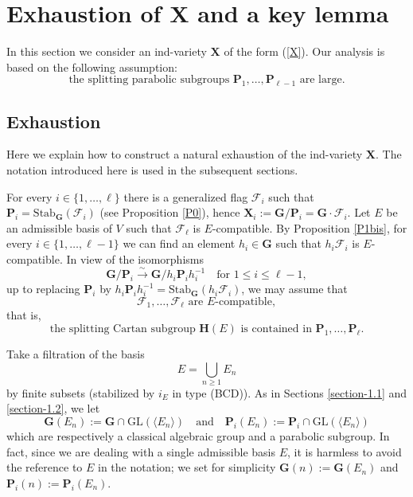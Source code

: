 \documentclass[12pt]{amsart}
\newcommand{\GL}{\mathrm{GL}}
\newcommand{\G}{\mathbf{G}}
\renewcommand{\H}{\mathbf{H}}
\renewcommand{\P}{\mathbf{P}}
\newcommand{\X}{\mathbf{X}}
\newcommand{\Ff}{\mathcal{F}}
\newcommand{\Stab}{\mathrm{Stab}}
\numberwithin{equation}{section}
\theoremstyle{definition}
\begin{document}
\section{Exhaustion of $\X$ and a key lemma}



\label{section-4}

In this section we consider an ind-variety $\X$ of the form (\ref{X}). Our analysis is based on the following assumption: 
\begin{equation}
\label{all-but-one}
\mbox{the splitting parabolic subgroups $\P_1,\ldots,\P_{\ell-1}$ are large.}
\end{equation}

\subsection{Exhaustion}

\label{exhaustion}

Here we explain how to construct a natural exhaustion of the ind-variety $\X$. The notation introduced here is used in the subsequent sections.

For every $i\in\{1,\ldots,\ell\}$ there is a generalized flag $\Ff_i$ such that $\P_i=\Stab_\G(\Ff_i)$ (see Proposition \ref{P0}), hence $\X_i:=\G/\P_i=\G\cdot\Ff_i$. Let $E$ be an admissible basis of $V$ such that $\Ff_\ell$ is $E$-compatible. By Proposition \ref{P1bis}, for every $i\in\{1,\ldots,\ell-1\}$ we can find an element $h_i\in\G$ such that $h_i\Ff_i$ is $E$-compatible.
In view of the isomorphisms
\[
\G/\P_i\stackrel{\sim}{\to} \G/h_i\P_ih_i^{-1}\quad\mbox{for $1\leq i\leq \ell-1$},
\]
up to replacing $\P_i$ by $h_i\P_ih_i^{-1}=\Stab_\G(h_i\Ff_i)$, we may assume that
\[\mbox{$\Ff_1,\ldots,\Ff_\ell$ are $E$-compatible},\]
that is, 
\[\mbox{the splitting Cartan subgroup $\H(E)$ is contained in $\P_1,\ldots,\P_\ell$}.\]

Take a filtration of the basis 
\[E=\bigcup_{n\geq 1}E_n\]
by finite subsets (stabilized by $i_E$ in type (BCD)).
As in Sections \ref{section-1.1} and \ref{section-1.2}, we let
\[\G(E_n):=\G\cap \GL(\langle E_n\rangle)\quad\mbox{and}\quad \P_i(E_n):=\P_i\cap\GL(\langle E_n\rangle)
\]
which are respectively a classical algebraic group and a parabolic subgroup. In fact, since we are dealing with a single admissible basis $E$, it is harmless to avoid the reference to $E$ in the notation; we set for simplicity $\G(n):=\G(E_n)$ and $\P_i(n):=\P_i(E_n)$.
\end{document}
